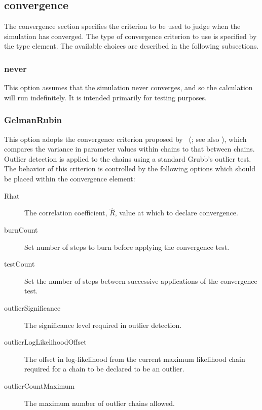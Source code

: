 \subsection{{\normalfont \ttfamily convergence}}

The {\normalfont \ttfamily convergence} section specifies the criterion to be used to judge when the simulation has converged. The type of convergence criterion to use is specified by the {\normalfont \ttfamily type} element. The available choices are described in the following subsections.

\subsubsection{{\normalfont \ttfamily never}}

This option assumes that the simulation never converges, and so the calculation will run indefinitely. It is intended primarily for testing purposes.

\subsubsection{{\normalfont \ttfamily GelmanRubin}}

This option adopts the convergence criterion proposed by \citeauthor{gelman_a._inference_1992}~(\citeyear{gelman_a._inference_1992}; see also \citealt{brooks_general_1998}), which compares the variance in parameter values within chains to that between chains. Outlier detection is applied to the chains using a standard Grubb's outlier test. The behavior of this criterion is controlled by the following options which should be placed within the {\normalfont \ttfamily convergence} element:
\begin{description}
\item [{\normalfont \ttfamily Rhat}] The correlation coefficient, $\hat{R}$, value at which to declare convergence.
\item [{\normalfont \ttfamily burnCount}] Set number of steps to burn before applying the convergence test.
\item [{\normalfont \ttfamily testCount}] Set the number of steps between successive applications of the convergence test.
\item [{\normalfont \ttfamily outlierSignificance}] The significance level required in outlier detection.
\item [{\normalfont \ttfamily outlierLogLikelihoodOffset}] The offset in log-likelihood from the current maximum likelihood chain required for a chain to be declared to be an outlier.
\item [{\normalfont \ttfamily outlierCountMaximum}] The maximum number of outlier chains allowed.
\end{description}

